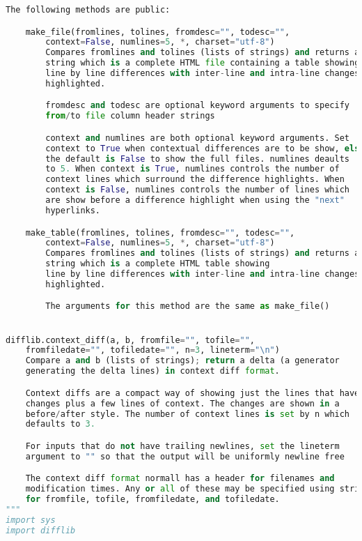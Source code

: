 \documentclass[a4paper,landscape]{report}
\begin{document}
\begin{lstlisting}[language=Python]
    The following methods are public:

    make_file(fromlines, tolines, fromdesc="", todesc="",
        context=False, numlines=5, *, charset="utf-8")
        Compares fromlines and tolines (lists of strings) and returns a
        string which is a complete HTML file containing a table showing
        line by line differences with inter-line and intra-line changes
        highlighted.

        fromdesc and todesc are optional keyword arguments to specify
        from/to file column header strings

        context and numlines are both optional keyword arguments. Set
        context to True when contextual differences are to be show, else
        the default is False to show the full files. numlines deaults
        to 5. When context is True, numlines controls the number of
        context lines which surround the difference highlights. When
        context is False, numlines controls the number of lines which
        are show before a difference highlight when using the "next"
        hyperlinks.

    make_table(fromlines, tolines, fromdesc="", todesc="",
        context=False, numlines=5, *, charset="utf-8")
        Compares fromlines and tolines (lists of strings) and returns a
        string which is a complete HTML table showing
        line by line differences with inter-line and intra-line changes
        highlighted.

        The arguments for this method are the same as make_file()


difflib.context_diff(a, b, fromfile="", tofile="",
    fromfiledate="", tofiledate="", n=3, lineterm="\n")
    Compare a and b (lists of strings); return a delta (a generator
    generating the delta lines) in context diff format.

    Context diffs are a compact way of showing just the lines that have
    changes plus a few lines of context. The changes are shown in a
    before/after style. The number of context lines is set by n which
    defaults to 3.

    For inputs that do not have trailing newlines, set the lineterm
    argument to "" so that the output will be uniformly newline free

    The context diff format normall has a header for filenames and
    modification times. Any or all of these may be specified using strings
    for fromfile, tofile, fromfiledate, and tofiledate.
"""
import sys
import difflib


\end{lstlisting}
\end{document}
